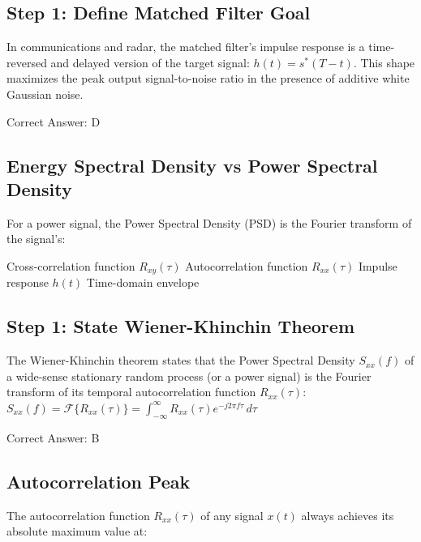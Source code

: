 \begin{solution}

\subsection*{Step 1: Define Matched Filter Goal}
In communications and radar, the matched filter's impulse response is a time-reversed and delayed version of the target signal: $h(t) = s^*(T - t)$. This shape maximizes the peak output signal-to-noise ratio in the presence of additive white Gaussian noise.

Correct Answer: D
\end{solution}

\clearpage

\subsection{Energy Spectral Density vs Power Spectral Density}

For a power signal, the Power Spectral Density (PSD) is the Fourier transform of the signal's:

\begin{choices}
    \choice Cross-correlation function $R_{xy}(\tau)$
    \correctchoice Autocorrelation function $R_{xx}(\tau)$
    \choice Impulse response $h(t)$
    \choice Time-domain envelope
\end{choices}

\begin{solution}

\subsection*{Step 1: State Wiener-Khinchin Theorem}
The Wiener-Khinchin theorem states that the Power Spectral Density $S_{xx}(f)$ of a wide-sense stationary random process (or a power signal) is the Fourier transform of its temporal autocorrelation function $R_{xx}(\tau)$:
$S_{xx}(f) = \mathcal{F}\{R_{xx}(\tau)\} = \int_{-\infty}^{\infty} R_{xx}(\tau) e^{-j 2\pi f \tau}\, d\tau$

Correct Answer: B
\end{solution}

\clearpage

\subsection{Autocorrelation Peak}

The autocorrelation function $R_{xx}(\tau)$ of any signal $x(t)$ always achieves its absolute maximum value at:


